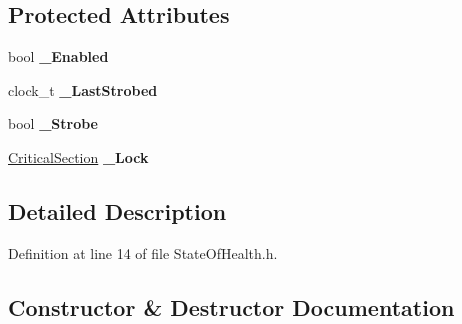 \subsection*{Protected Attributes}
\begin{DoxyCompactItemize}
\item 
\mbox{\label{class_canberra_1_1_utility_1_1_core_1_1_state_of_health_aa53de9f3416e2a98b56413f4e7930eb9}} 
bool {\bfseries \+\_\+\+Enabled}
\item 
\mbox{\label{class_canberra_1_1_utility_1_1_core_1_1_state_of_health_a4fb8a1359b2e5525484c2675e60b2337}} 
clock\+\_\+t {\bfseries \+\_\+\+Last\+Strobed}
\item 
\mbox{\label{class_canberra_1_1_utility_1_1_core_1_1_state_of_health_a1c481c78738569b7a786bff83966ed4a}} 
bool {\bfseries \+\_\+\+Strobe}
\item 
\mbox{\label{class_canberra_1_1_utility_1_1_core_1_1_state_of_health_a2d36c9c45b41c18127f4423af518c58b}} 
\hyperlink{class_canberra_1_1_utility_1_1_core_1_1_critical_section}{Critical\+Section} {\bfseries \+\_\+\+Lock}
\end{DoxyCompactItemize}


\subsection{Detailed Description}


Definition at line 14 of file State\+Of\+Health.\+h.



\subsection{Constructor \& Destructor Documentation}
\mbox{\label{class_canberra_1_1_utility_1_1_core_1_1_state_of_health_adbb3e21233f1821db0bede0aa822bcf8_adbb3e21233f1821db0bede0aa822bcf8}} 
